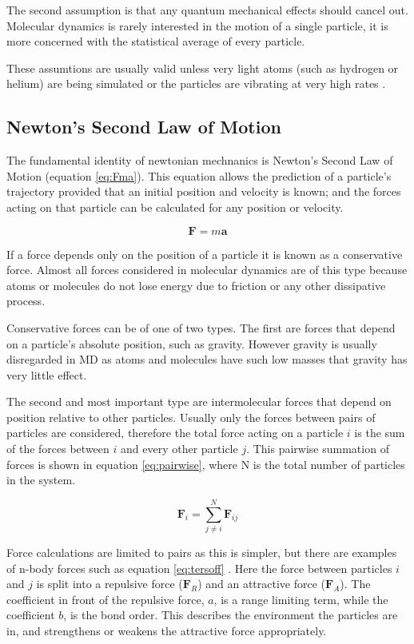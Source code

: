 \message{ !name(main.tex)}\documentclass[12pt]{UoAthesis}
\begin{document}
The second assumption is that any quantum mechanical effects should
cancel out. Molecular dynamics is rarely interested in the motion of a
single particle, it is more concerned with the statistical average of
every particle.

These assumtions are usually valid unless very light atoms (such as
hydrogen or helium) are being simulated or the particles are vibrating
at very high rates \cite{Frenkel2002}.

\subsection{Newton's Second Law of Motion}

The fundamental identity of newtonian mechnanics is Newton's Second
Law of Motion (equation \eqref{eq:Fma}). This equation allows the prediction of a
particle's trajectory provided that an initial position and velocity
is known; and the forces acting on that particle can be calculated for
any position or velocity.

\begin{equation}
  \mathbf{F} = m\mathbf{a}
  \label{eq:Fma} 
\end{equation}

If a force depends only on the position of a particle it is known as a
conservative force. Almost all forces considered in molecular dynamics
are of this type because atoms or molecules do not lose energy due to
friction or any other dissipative process.

Conservative forces can be of one of two types.  The first are forces
that depend on a particle's absolute position, such as gravity.
However gravity is usually disregarded in MD as atoms and molecules
have such low masses that gravity has very little effect.

The second and most important type are intermolecular forces that
depend on position relative to other particles.  Usually only the
forces between pairs of particles are considered, therefore the total
force acting on a particle $i$ is the sum of the forces between $i$
and every other particle $j$.  This pairwise summation of forces is
shown in equation \eqref{eq:pairwise}, where N is the total number of
particles in the system.

\begin{equation} 
  \mathbf{F}_i = \sum_{j \not= i}^{N}\mathbf{F}_{ij}
  \label{eq:pairwise}
\end{equation}

Force calculations are limited to pairs as this is simpler, but there
are examples of n-body forces such as equation \eqref{eq:tersoff}
\cite{Tersoff1988}.  Here the force between particles $i$ and $j$ is
split into a repulsive force ($\mathbf{F}_R$) and an attractive force
($\mathbf{F}_A$).  The coefficient in front of the repulsive force,
$a$, is a range limiting term, while the coefficient $b$, is the bond
order.  This describes the environment the particles are in, and
strengthens or weakens the attractive force appropriately.
\end{document}
